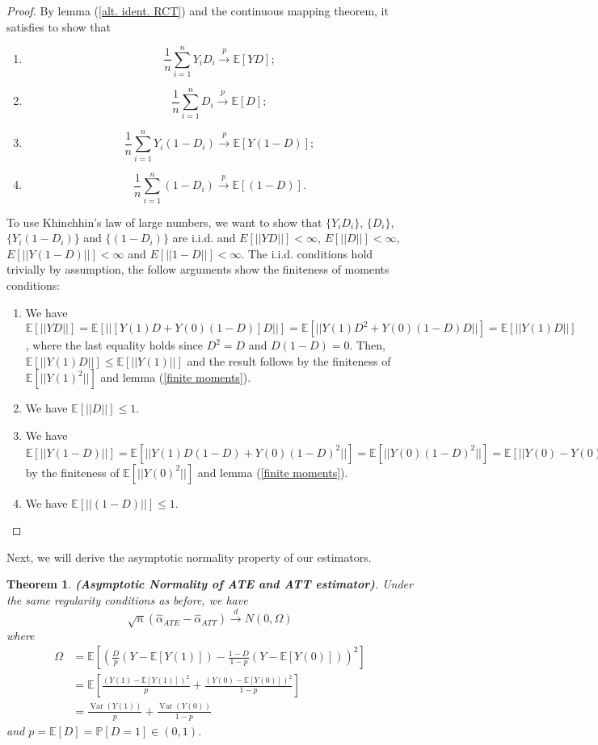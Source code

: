 \documentclass[11pt,a4paper]{amsart}
\theoremstyle{plain}
\newtheorem{theorem}{Theorem}
\theoremstyle{definition}
\begin{document}
	\begin{proof}
		By lemma (\ref{alt. ident. RCT}) and the continuous mapping theorem, it satisfies to show that 
		\begin{enumerate}
			\item 
			\[	\frac{1}{n} \sum_{i = 1}^{n} Y_{i}D_{i} \stackrel{p}{\longrightarrow} \mathbb{E}[YD];	\]
			\item 
			\[	\frac{1}{n} \sum_{i = 1}^{n} D_{i} \stackrel{p}{\longrightarrow} \mathbb{E}[D];	\]
			\item 
			\[	\frac{1}{n} \sum_{i = 1}^{n} Y_{i}(1-D_{i}) \stackrel{p}{\longrightarrow} \mathbb{E}[Y(1-D)];	\]
			\item 
			\[		\frac{1}{n} \sum_{i = 1}^{n} (1-D_{i}) \stackrel{p}{\longrightarrow} \mathbb{E}[(1-D)].	\]
		\end{enumerate}
	To use Khinchhin's law of large numbers, we want to show that $\{Y_{i}D_{i}\}$, $\{D_{i}\}$, $\{Y_{i}(1-D_{i})\}$ and $\{(1-D_{i})\}$ are i.i.d. and $E[||YD||] < \infty$, $E[||D||] < \infty$, $E[||Y(1-D)||] < \infty$ and $E[||1-D||] < \infty$. The i.i.d. conditions hold trivially by assumption, the follow arguments show the finiteness of moments conditions:
	\begin{enumerate}
		\item We have $\mathbb{E}[||YD||] = \mathbb{E}[||[Y(1)D + Y(0)(1-D)]D||] = \mathbb{E}[||	Y(1)D^{2} +Y(0)(1-D)D	||] = \mathbb{E}[||	Y(1)D	||]$, where the last equality holds since $D^{2} = D$ and $D(1-D) = 0$. Then, $\mathbb{E}[||Y(1)D||] \leq \mathbb{E}[||Y(1)||]$ and the result follows by the finiteness of $\mathbb{E}[|| Y(1)^{2} ||]$ and lemma (\ref{finite moments}).
		\item We have $\mathbb{E}[||D||] \leq 1$.
		\item We have $\mathbb{E}[||Y(1-D)||] = \mathbb{E}[||Y(1)D(1-D) + Y(0)(1-D)^{2}||] = \mathbb{E}[||Y(0)(1-D)^{2}||] = \mathbb{E}[||Y(0) - Y(0)D||]\leq 2\mathbb{E}[||Y(0)||] < \infty$ by the finiteness of $\mathbb{E}[|| Y(0)^{2} ||]$ and lemma (\ref{finite moments}).
		\item  We have $\mathbb{E}[||(1-D)||] \leq 1$.
	\end{enumerate}
	\end{proof}
	Next, we will derive the asymptotic normality property of our estimators.
	\newpage
	\begin{theorem}
			\textbf{(Asymptotic Normality of ATE and ATT estimator)}. Under the same regularity conditions as before, we have 
			\[	\sqrt{n}(\hat{\alpha}_{ATE} - \hat{\alpha}_{ATT}) \stackrel{d}{\longrightarrow} N(0, \Omega) 	\] 
			where 
			\[\begin{aligned}
			\Omega &=\mathbb{E}\left[\left(\frac{D}{p}(Y-\mathbb{E}[Y(1)])-\frac{1-D}{1-p}(Y-\mathbb{E}[Y(0)])\right)^{2}\right] \\
			&=\mathbb{E}\left[\frac{(Y(1)-\mathbb{E}[Y(1)])^{2}}{p}+\frac{(Y(0)-\mathbb{E}[Y(0)])^{2}}{1-p}\right] \\
			&=\frac{\operatorname{Var}(Y(1))}{p}+\frac{\operatorname{Var}(Y(0))}{1-p}
			\end{aligned}	\]
			and $p = \mathbb{E}[D] = \mathbb{P}[D=1] \in (0,1)$.
	\end{theorem}
	
\end{document}
